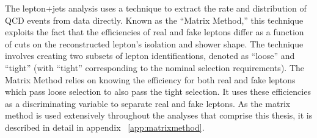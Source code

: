 The lepton+jets analysis uses a technique to extract the rate and distribution of QCD events from data directly.
Known as the ``Matrix Method,'' this technique exploits the fact that the efficiencies of real and fake leptons differ as a function of cuts on the reconstructed lepton's isolation and shower shape.
The technique involves creating two subsets of lepton identifications, denoted as ``loose'' and ``tight'' (with ``tight'' corresponding to the nominal selection requirements).
The Matrix Method relies on knowing the efficiency for both real and fake leptons which pass loose selection to also pass the tight selection.
It uses these efficiencies as a discriminating variable to separate real and fake leptons.
As the matrix method is used extensively throughout the analyses that comprise this thesis, it is described in detail in appendix ~\ref{app:matrixmethod}.





